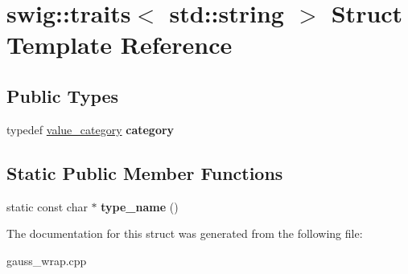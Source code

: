 \hypertarget{structswig_1_1traits_3_01std_1_1string_01_4}{\section{swig\-:\-:traits$<$ std\-:\-:string $>$ Struct Template Reference}
\label{structswig_1_1traits_3_01std_1_1string_01_4}
}
\subsection*{Public Types}
\begin{DoxyCompactItemize}
\item 
\hypertarget{structswig_1_1traits_3_01std_1_1string_01_4_aec31e973b1220342e0b89c6b8fe96684}{typedef \hyperlink{structswig_1_1value__category}{value\-\_\-category} {\bfseries category}}\label{structswig_1_1traits_3_01std_1_1string_01_4_aec31e973b1220342e0b89c6b8fe96684}

\end{DoxyCompactItemize}
\subsection*{Static Public Member Functions}
\begin{DoxyCompactItemize}
\item 
\hypertarget{structswig_1_1traits_3_01std_1_1string_01_4_ab4142e71b21ccbad9a8161a116f660d2}{static const char $\ast$ {\bfseries type\-\_\-name} ()}\label{structswig_1_1traits_3_01std_1_1string_01_4_ab4142e71b21ccbad9a8161a116f660d2}

\end{DoxyCompactItemize}


The documentation for this struct was generated from the following file\-:\begin{DoxyCompactItemize}
\item 
gauss\-\_\-wrap.\-cpp\end{DoxyCompactItemize}
